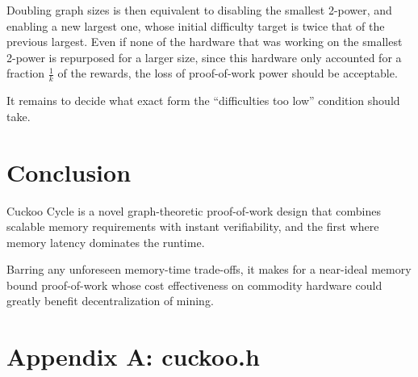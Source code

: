 \documentclass{beamer}
\begin{document}
Doubling graph sizes is then equivalent to disabling the smallest 2-power,
and enabling a new largest one, whose initial difficulty target is twice that of the previous largest.
Even if none of the hardware that was working on the smallest 2-power is repurposed for a larger size,
since this hardware only accounted for a fraction $\frac{1}{k}$ of the rewards, the loss of
proof-of-work power should be acceptable.

It remains to decide what exact form the ``difficulties too low'' condition should take.

\section{Conclusion}
Cuckoo Cycle is a novel graph-theoretic proof-of-work design that combines
scalable memory requirements with instant verifiability,
and the first where memory latency dominates the runtime.

Barring any unforeseen memory-time trade-offs, it makes for a near-ideal memory bound proof-of-work
whose cost effectiveness on commodity hardware could greatly benefit decentralization of mining.




\lstset{language=C,basicstyle=\footnotesize}
\section{Appendix A: cuckoo.h}


%

%

\begin{frame}
\end{frame}
\end{document}
